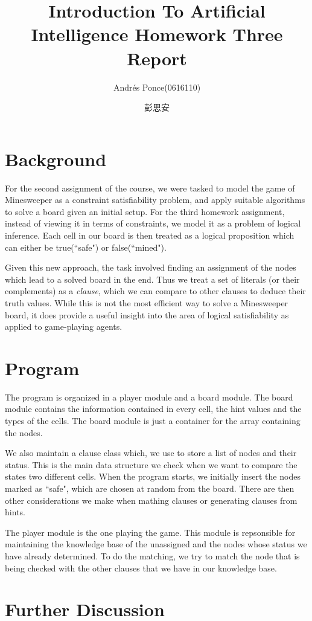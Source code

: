 \documentclass{article}
\author{Andr\'es Ponce(0616110)\\
\and
彭思安
}
\title{Introduction To Artificial Intelligence Homework Three Report}
\begin{document}
\maketitle
\section{Background}
For the second assignment of the course, we were tasked to model the game of Minesweeper as a 
constraint satisfiability problem, and apply suitable algorithms to solve a board given an initial 
setup. For the third homework assignment, instead of viewing it in terms of constraints, we model it
as a problem of logical inference. Each cell in our board is then treated as a logical proposition
which can either be true(``safe") or false(``mined").

Given this new approach, the task involved finding an assignment of the nodes which lead to a solved 
board in the end. Thus we treat a set of literals (or their complements) as a \textit{clause}, which
we can compare to other clauses to deduce their truth values. While this is not the most efficient
way to solve a Minesweeper board, it does provide a useful insight into the area of logical satisfiability
as applied to game-playing agents.

\section{Program}
The program is organized in a player module and a board module. The board module contains the information 
contained in every cell, the hint values and the types of the cells. The board module is just a container
for the array containing the nodes.

We also maintain a clause class which, we use to store a list of nodes and their status. This is the main
data structure we check when we want to compare the states two different cells. When the program starts, 
we initially insert the nodes marked as ``safe", which are chosen at random from the board. There are
then other considerations we make when mathing clauses or generating clauses from hints.

The player module is the one playing the game. This module is repsonsible for maintaining the knowledge
base of the unassigned and the nodes whose status we have already determined. To do the matching, we 
try to match the node that is being checked with the other clauses that we have in our knowledge base.

\section{Further Discussion}
\end{document}
